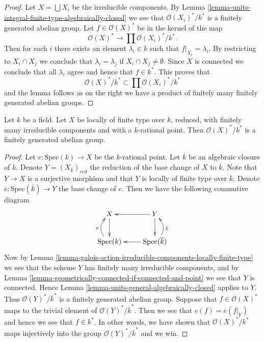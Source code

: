 \begin{proof}
Let $X = \bigcup X_i$ be the irreducible components. By
Lemma \ref{lemma-units-integral-finite-type-algebraically-closed}
we see that $\mathcal{O}(X_i)^*/k^*$ is a finitely generated
abelian group. Let $f \in \mathcal{O}(X)^*$ be in the kernel
of the map
$$
\mathcal{O}(X)^* \longrightarrow \prod \mathcal{O}(X_i)^*/k^*.
$$
Then for each $i$ there exists an element $\lambda_i \in k$
such that $f|_{X_i} = \lambda_i$.
By restricting to $X_i \cap X_j$ we conclude that
$\lambda_i = \lambda_j$ if $X_i \cap X_j \not = \emptyset$.
Since $X$ is connected we conclude that all $\lambda_i$ agree
and hence that $f \in k^*$. This proves that
$$
\mathcal{O}(X)^*/k^* \subset \prod \mathcal{O}(X_i)^*/k^*
$$
and the lemma follows as on the right we have a product of finitely
many finitely generated abelian groups.
\end{proof}

\begin{lemma}
\label{lemma-units-general-rational-point}
Let $k$ be a field.
Let $X$ be locally of finite type over $k$, reduced, with finitely
many irreducible components and with a $k$-rational point.
Then $\mathcal{O}(X)^*/k^*$ is a finitely generated abelian group.
\end{lemma}

\begin{proof}
Let $e : \text{Spec}(k) \to X$ be the $k$-rational point.
Let $\overline{k}$ be an algebraic closure of $k$.
Denote $Y = (X_{\overline{k}})_{red}$ the reduction of the base
change of $X$ to $\overline{k}$. Note that $Y \to X$ is a surjective
morphism and that $Y$ is locally of finite type over $\overline{k}$.
Denote
$\overline{e} : \text{Spec}(\overline{k}) \to Y$
the base change of $e$. Then we have the following commutive diagram
$$
\xymatrix{
X \ar[d] & Y \ar[l] \ar[d] \\
\text{Spec}(k) \ar@/^1pc/[u]^e &
\text{Spec}(\overline{k}) \ar[l] \ar@/_1pc/[u]_{\overline{e}}
}
$$
Now by
Lemma \ref{lemma-galois-action-irreducible-components-locally-finite-type}
we see that the scheme $Y$ has finitely many irreducible components,
and by
Lemma \ref{lemma-geometrically-connected-if-connected-and-point}
we see that $Y$ is connected.
Hence
Lemma \ref{lemma-units-general-algebraically-closed}
applies to $Y$. Thus
$\mathcal{O}(Y)^*/\overline{k}^*$ is a finitely
generated abelian group. Suppose that
$f \in \mathcal{O}(X)^*$ maps to the trivial element of
$\mathcal{O}(Y)^*/\overline{k}^*$. Then we see that
$e(f) = \overline{e}(f|_Y)$ and hence we see that $f \in k^*$.
In other words, we have shown that $\mathcal{O}(X)^*/k^*$
maps injectively into the group $\mathcal{O}(Y)^*/\overline{k}^*$
and we win.
\end{proof}

